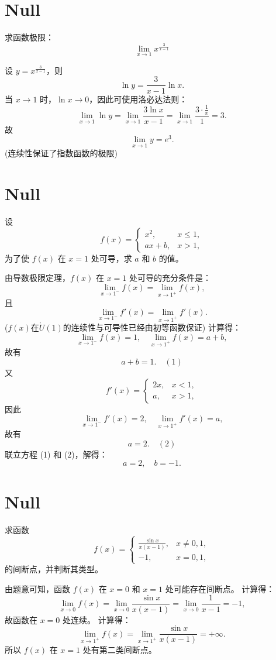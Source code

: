 \documentclass[11pt]{../../TexTemplate/elegantbook} %
\begin{document}
\section{Null}
求函数极限：
\[
\lim_{x \to 1} x^{\frac{3}{x-1}}
\]
\begin{solution}
    设 \( y = x^{\frac{3}{x-1}} \)，则
    \[
    \ln y = \frac{3}{x-1} \ln x.
    \]
    当 \( x \to 1 \) 时，\( \ln x \to 0 \)，因此可使用洛必达法则：
    \[
    \lim_{x \to 1} \ln y = \lim_{x \to 1} \frac{3 \ln x}{x-1} = \lim_{x \to 1} \frac{3 \cdot \frac{1}{x}}{1} = 3.
    \]
    故
    \[
    \lim_{x \to 1} y = e^{3}.
    \]
    (连续性保证了指数函数的极限)
\end{solution}

\section{Null}
设
\[
f(x) = \begin{cases} x^{2}, & x\leqslant 1, \\ ax+b, & x>1, \end{cases}
\]
为了使 \( f(x) \) 在 \( x=1 \) 处可导，求 \( a \) 和 \( b \) 的值。
\begin{solution}
    由导数极限定理，\( f(x) \) 在 \( x=1 \) 处可导的充分条件是：
    \[
    \lim_{x \to 1^{-}} f(x) = \lim_{x \to 1^{+}} f(x),
    \]
    且
    \[
    \lim_{x \to 1^{-}} f'(x) = \lim_{x \to 1^{+}} f'(x).
    \]
    (\(f(x)\)在\(\mathring{U}(1)\)的连续性与可导性已经由初等函数保证)
    \newline 计算得：
    \[
    \lim_{x \to 1^{-}} f(x) = 1, \quad \lim_{x \to 1^{+}} f(x) = a + b,
    \]
    故有
    \[
    a + b = 1. \quad (1)
    \]
    又
    \[
    f'(x) = \begin{cases} 2x, & x<1, \\ a, & x>1, \end{cases}
    \]
    因此
    \[
    \lim_{x \to 1^{-}} f'(x) = 2, \quad \lim_{x \to 1^{+}} f'(x) = a,
    \]
    故有
    \[
    a = 2. \quad (2)
    \]
    联立方程 (1) 和 (2)，解得：
    \[
    a = 2, \quad b = -1.
    \]
\end{solution}

\section{Null}
求函数
\[
f(x) = \begin{cases} \frac{\sin x}{x(x-1)}, & x \neq 0,1, \\ -1, & x = 0,1, \end{cases}
\]
的间断点，并判断其类型。
\begin{solution}
    由题意可知，函数 \( f(x) \) 在 \( x=0 \) 和 \( x=1 \) 处可能存在间断点。
    \newline 计算得：
    \[
    \lim_{x \to 0} f(x) = \lim_{x \to 0} \frac{\sin x}{x(x-1)} = \lim_{x \to 0} \frac{1}{x-1} = -1,
    \]
    故函数在 \( x=0 \) 处连续。
    \newline 计算得：
    \[
    \lim_{x \to 1^{+}} f(x) = \lim_{x \to 1^{+}} \frac{\sin x}{x(x-1)} = +\infty.
    \]
    所以 \( f(x) \) 在 \( x=1 \) 处有第二类间断点。
\end{solution}
\end{document}
